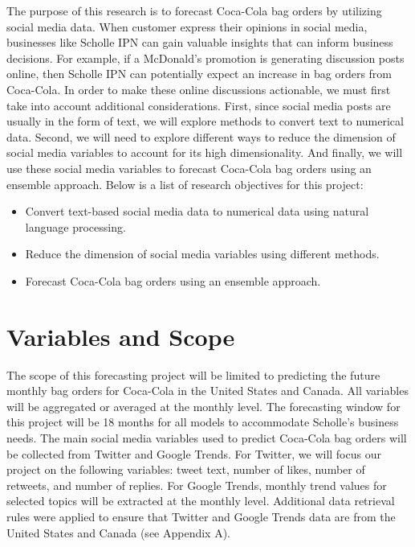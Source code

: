 \documentclass[12pt,oneside]{chicagocapstone}
\providecommand{\tightlist}{%
  \setlength{\itemsep}{0pt}\setlength{\parskip}{0pt}}
\begin{document}
The purpose of this research is to forecast Coca-Cola bag orders by
utilizing social media data. When customer express their opinions in
social media, businesses like Scholle IPN can gain valuable insights
that can inform business decisions. For example, if a McDonald's
promotion is generating discussion posts online, then Scholle IPN can
potentially expect an increase in bag orders from Coca-Cola. In order to
make these online discussions actionable, we must first take into
account additional considerations. First, since social media posts are
usually in the form of text, we will explore methods to convert text to
numerical data. Second, we will need to explore different ways to reduce
the dimension of social media variables to account for its high
dimensionality. And finally, we will use these social media variables to
forecast Coca-Cola bag orders using an ensemble approach. Below is a
list of research objectives for this project:
\begin{itemize}
\tightlist
\item
  Convert text-based social media data to numerical data using natural
  language processing.
\item
  Reduce the dimension of social media variables using different
  methods.
\item
  Forecast Coca-Cola bag orders using an ensemble approach.
\end{itemize}
\section*{Variables and Scope}\label{variables-and-scope}

The scope of this forecasting project will be limited to predicting the
future monthly bag orders for Coca-Cola in the United States and Canada.
All variables will be aggregated or averaged at the monthly level. The
forecasting window for this project will be 18 months for all models to
accommodate Scholle's business needs. The main social media variables
used to predict Coca-Cola bag orders will be collected from Twitter and
Google Trends. For Twitter, we will focus our project on the following
variables: tweet text, number of likes, number of retweets, and number
of replies. For Google Trends, monthly trend values for selected topics
will be extracted at the monthly level. Additional data retrieval rules
were applied to ensure that Twitter and Google Trends data are from the
United States and Canada (see Appendix A).
\end{document}
